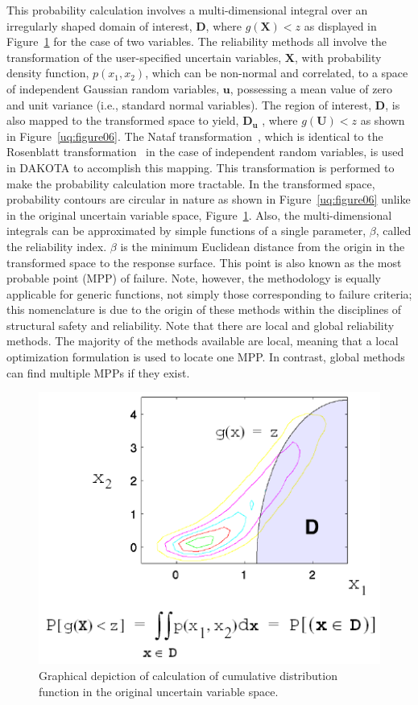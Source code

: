 This probability calculation involves a multi-dimensional integral
over an irregularly shaped domain of interest, $\mathbf{D}$, where
$g(\mathbf{X}) < z$ as displayed in Figure~\ref{uq:figure05} for the
case of two variables.  The reliability methods all involve the
transformation of the user-specified uncertain variables,
$\mathbf{X}$, with probability density function, $p(x_1,x_2)$, which
can be non-normal and correlated, to a space of independent Gaussian
random variables, $\mathbf{u}$, possessing a mean value of zero and
unit variance (i.e., standard normal variables). The region of
interest, $\mathbf{D}$, is also mapped to the transformed space to
yield, $\mathbf{D_{u}}$ , where $g(\mathbf{U}) < z$ as shown in
Figure~\ref{uq:figure06}.  The Nataf transformation~\cite{Der86},
which is identical to the Rosenblatt transformation~\cite{Ros52} in
the case of independent random variables, is used in DAKOTA to
accomplish this mapping. This transformation is performed to make the
probability calculation more tractable. In the transformed space,
probability contours are circular in nature as shown in
Figure~\ref{uq:figure06} unlike in the original uncertain variable
space, Figure~\ref{uq:figure05}. Also, the multi-dimensional integrals
can be approximated by simple functions of a single parameter,
$\beta$, called the reliability index.  $\beta$ is the minimum
Euclidean distance from the origin in the transformed space to the
response surface. This point is also known as the most probable point
(MPP) of failure. Note, however, the methodology is equally applicable
for generic functions, not simply those corresponding to failure
criteria; this nomenclature is due to the origin of these methods
within the disciplines of structural safety and reliability.
Note that there are local and global reliability methods.  The majority 
of the methods available are local, meaning that a local optimization 
formulation is used to locate one MPP.  In contrast, global methods
can find multiple MPPs if they exist.
\begin{figure}
  \centering
  \includegraphics[scale=0.75]{images/cdf_orig_graphic}
  \caption{Graphical depiction of calculation of cumulative
    distribution function in the original uncertain variable space.}
  \label{uq:figure05}
\end{figure}


